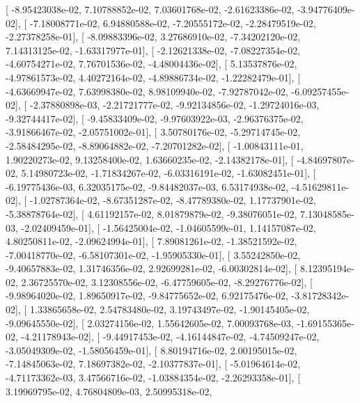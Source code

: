\documentclass{article}
\begin{document}
       [ -8.95423038e-02,   7.10788852e-02,   7.03601768e-02,
         -2.61623386e-02,  -3.94776409e-02],
       [ -7.18008771e-02,   6.94880588e-02,  -7.20555172e-02,
         -2.28479519e-02,  -2.27378258e-01],
       [ -8.09883396e-02,   3.27686910e-02,  -7.34202120e-02,
          7.14313125e-02,  -1.63317977e-01],
       [ -2.12621338e-02,  -7.08227354e-02,  -4.60754271e-02,
          7.76701536e-02,  -4.48004436e-02],
       [  5.13537876e-02,  -4.97861573e-02,   4.40272164e-02,
         -4.89886734e-02,  -1.22282479e-01],
       [ -4.63669947e-02,   7.63998380e-02,   8.98109940e-02,
         -7.92787042e-02,  -6.09257455e-02],
       [ -2.37880898e-03,  -2.21721777e-02,  -9.92134856e-02,
         -1.29724016e-03,  -9.32744417e-02],
       [ -9.45833409e-02,  -9.97603922e-03,  -2.96376375e-02,
         -3.91866467e-02,  -2.05751002e-01],
       [  3.50780176e-02,  -5.29714745e-02,  -2.58484295e-02,
         -8.89064882e-02,  -7.20701282e-02],
       [ -1.00843111e-01,   1.90220273e-02,   9.13258400e-02,
          1.63660235e-02,  -2.14382178e-01],
       [ -4.84697807e-02,   5.14980723e-02,  -1.71834267e-02,
         -6.03316191e-02,  -1.63082451e-01],
       [ -6.19775436e-03,   6.32035175e-02,  -9.84482037e-03,
          6.53174938e-02,  -4.51629811e-02],
       [ -1.02787364e-02,  -8.67351287e-02,  -8.47789380e-02,
          1.17737901e-02,  -5.38878764e-02],
       [  4.61192157e-02,   8.01879879e-02,  -9.38076051e-02,
          7.13048585e-03,  -2.02409459e-01],
       [ -1.56425004e-02,  -1.04605599e-01,   1.14157087e-02,
          4.80250811e-02,  -2.09624994e-01],
       [  7.89081261e-02,  -1.38521592e-02,  -7.00418770e-02,
         -6.58107301e-02,  -1.95905330e-01],
       [  3.55242850e-02,  -9.40657883e-02,   1.31746356e-02,
          2.92699281e-02,  -6.00302814e-02],
       [  8.12395194e-02,   2.36725570e-02,   3.12308556e-02,
         -6.47759605e-02,  -8.29276776e-02],
       [ -9.98964020e-02,   1.89650917e-02,  -9.84775652e-02,
          6.92175476e-02,  -3.81728342e-02],
       [  1.33865658e-02,   2.54783480e-02,   3.19743497e-02,
         -1.90145405e-02,  -9.09645550e-02],
       [  2.03274156e-02,   1.55642605e-02,   7.00093768e-03,
         -1.69155365e-02,  -4.21178943e-02],
       [ -9.44917453e-02,  -4.16144847e-02,  -4.74509247e-02,
         -3.05049309e-02,  -1.58056459e-01],
       [  8.80194716e-02,   2.00195015e-02,  -7.14845063e-02,
          7.18697382e-02,  -2.10377837e-01],
       [ -5.01964614e-02,  -4.71173362e-03,   3.47566716e-02,
         -1.03884354e-02,  -2.26293358e-01],
       [  3.19969795e-02,   4.76804809e-03,   2.50995318e-02,
\end{document}
